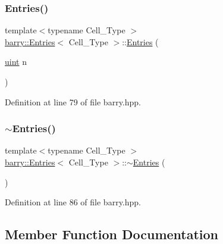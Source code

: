 \subsubsection{\texorpdfstring{Entries()}{Entries()}\hspace{0.1cm}{\footnotesize\ttfamily [2/2]}}
{\footnotesize\ttfamily template$<$typename Cell\+\_\+\+Type $>$ \\
\hyperlink{classbarry_1_1_entries}{barry\+::\+Entries}$<$ Cell\+\_\+\+Type $>$\+::\hyperlink{classbarry_1_1_entries}{Entries} (\begin{DoxyParamCaption}\item[{\hyperlink{namespacebarry_a11dfc53ddb4672278319aa04f1e09a6c}{uint}}]{n }\end{DoxyParamCaption})\hspace{0.3cm}{\ttfamily [inline]}}



Definition at line 79 of file barry.\+hpp.

\mbox{\label{classbarry_1_1_entries_a8d74af4d3b545fb79f9f4e8e894160cb}} 
\subsubsection{\texorpdfstring{$\sim$\+Entries()}{~Entries()}}
{\footnotesize\ttfamily template$<$typename Cell\+\_\+\+Type $>$ \\
\hyperlink{classbarry_1_1_entries}{barry\+::\+Entries}$<$ Cell\+\_\+\+Type $>$\+::$\sim$\hyperlink{classbarry_1_1_entries}{Entries} (\begin{DoxyParamCaption}{ }\end{DoxyParamCaption})\hspace{0.3cm}{\ttfamily [inline]}}



Definition at line 86 of file barry.\+hpp.



\subsection{Member Function Documentation}
\mbox{\label{classbarry_1_1_entries_a0c1e6fb0a6e2c462ba782433ac11e026}} 
